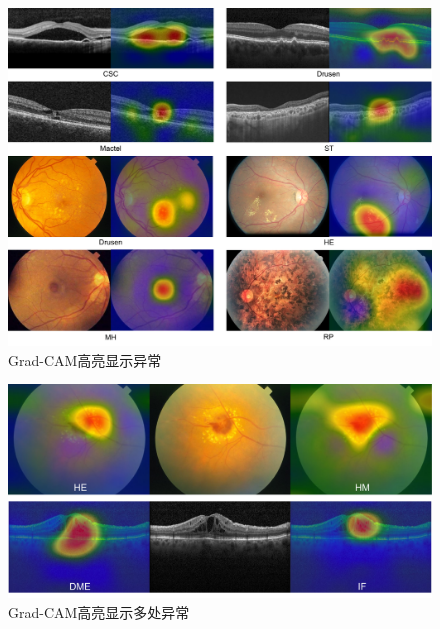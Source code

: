 \documentclass{article}
\begin{document}
		\begin{figure}[htbp]
			\centering
			\includegraphics[width=\linewidth]{Figs/abnormity_gradCAM.pdf}
			\caption{Grad-CAM高亮显示异常}
			\vspace{0.3cm}
			\label{fig:gradCAM}
		\end{figure}
		
		\begin{figure}[htbp]
			\centering
			\includegraphics[width=0.8\linewidth]{Figs/abnormity_gradCAM_multiple_abnormities.pdf}
			\caption{Grad-CAM高亮显示多处异常}
			\vspace{0.3cm}
			\label{fig:gradCAM_multi_abnormity}
		\end{figure}
	
		\vspace{1.5cm}
	
	
		
	\pagebreak	
	
\end{document}
